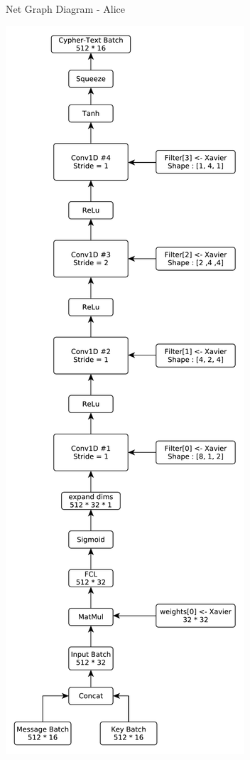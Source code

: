 \documentclass[12pt]{article}
\begin{document}
\newpage
\begin{blockfigure}{ Net Graph Diagram - Alice}
	\begin{center}
		\includegraphics[height=0.93\textheight]{Alice-Diagram}
	\end{center}
\end{blockfigure}
\end{document}
